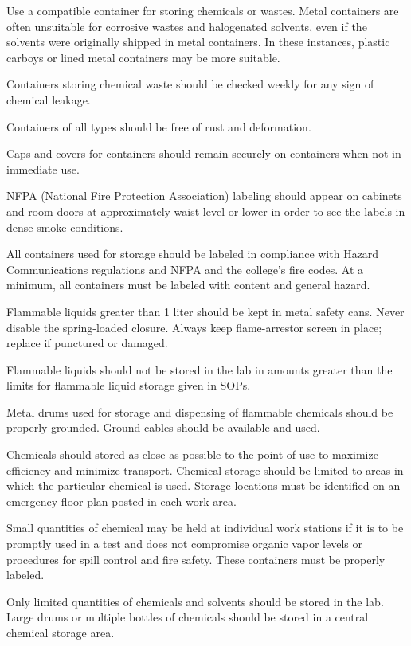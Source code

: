 \documentclass[12pt]{../SOP2}
\begin{document}
\NP Use a compatible container for storing chemicals or wastes. Metal containers are often unsuitable for corrosive wastes and halogenated solvents, even if the solvents were originally shipped in metal containers. In these instances, plastic carboys or lined metal containers may be more suitable. 

\NP Containers storing chemical waste should be checked weekly for any sign of chemical leakage.

\NP Containers of all types should be free of rust and deformation. 

\NP Caps and covers for containers should remain securely on containers when not in immediate use.

\NP NFPA (National Fire Protection Association) labeling should appear on cabinets and room doors at approximately waist level or lower in order to see the labels in dense smoke conditions.

\NP All containers used for storage should be labeled in compliance with Hazard Communications regulations and NFPA and the college’s fire codes. At a minimum, all containers must be labeled with content and general hazard.

\NP Flammable liquids greater than 1 liter should be kept in metal safety cans. Never disable the spring-loaded closure. Always keep flame-arrestor screen in place; replace if punctured or damaged. 

\NP Flammable liquids should not be stored in the lab in amounts greater than the limits for flammable liquid storage given in SOPs. 

\NP Metal drums used for storage and dispensing of flammable chemicals should be properly grounded. Ground cables should be available and used.

\NP Chemicals should stored as close as possible to the point of use to maximize efficiency and minimize transport. Chemical storage should be limited to areas in which the particular chemical is used. Storage locations must be identified on an emergency floor plan posted in each work area.

\NP Small quantities of chemical may be held at individual work stations if it is to be promptly used in a test and does not compromise organic vapor levels or procedures for spill control and fire safety. These containers must be properly labeled.

\NP Only limited quantities of chemicals and solvents should be stored in the lab. Large drums or multiple bottles of chemicals should be stored in a central chemical storage area.
\end{document}

